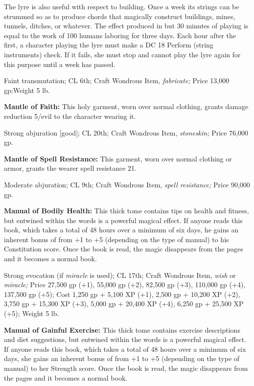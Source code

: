 \documentclass{article}
\begin{document}
The lyre is also useful with respect to building. Once a week its strings can be 
strummed so as to produce chords that magically construct buildings, mines, tunnels, 
ditches, or whatever. The effect produced in but 30 minutes of playing is equal 
to the work of 100 humans laboring for three days. Each hour after the first, a 
character playing the lyre must make a DC 18 Perform (string instruments) check. 
If it fails, she must stop and cannot play the lyre again for this purpose until 
a week has passed.

Faint transmutation; CL 6th; Craft Wondrous Item, \textit{fabricate; }Price 13,000 
gp;Weight 5 lb.

\textbf{Mantle of Faith:} This holy garment, worn over normal clothing, grants 
damage reduction 5/evil to the character wearing it.

Strong abjuration [good]; CL 20th; Craft Wondrous Item, \textit{stoneskin; }Price 
76,000 gp.

\textbf{Mantle of Spell Resistance:} This garment, worn over normal clothing or 
armor, grants the wearer spell resistance 21.

Moderate abjuration; CL 9th; Craft Wondrous Item, \textit{spell resistance; }Price 
90,000 gp.

\textbf{Manual of Bodily Health: }This thick tome contains tips on health and fitness, 
but entwined within the words is a powerful magical effect. If anyone reads this 
book, which takes a total of 48 hours over a minimum of six days, he gains an inherent 
bonus of from +1 to +5 (depending on the type of manual) to his Constitution score. 
Once the book is read, the magic disappears from the pages and it becomes a normal 
book.

Strong evocation (if \textit{miracle }is used); CL 17th; Craft Wondrous Item, \textit{wish 
}or \textit{miracle; }Price 27,500 gp (+1), 55,000 gp (+2), 82,500 gp (+3), 110,000 
gp (+4), 137,500 gp (+5); Cost 1,250 gp + 5,100 XP (+1), 2,500 gp + 10,200 XP (+2), 
3,750 gp + 15,300 XP (+3), 5,000 gp + 20,400 XP (+4), 6,250 gp + 25,500 XP (+5); 
Weight 5 lb.

\textbf{Manual of Gainful Exercise:} This thick tome contains exercise descriptions 
and diet suggestions, but entwined within the words is a powerful magical effect. 
If anyone reads this book, which takes a total of 48 hours over a minimum of six 
days, she gains an inherent bonus of from +1 to +5 (depending on the type of manual) 
to her Strength score. Once the book is read, the magic disappears from the pages 
and it becomes a normal book.
\end{document}
